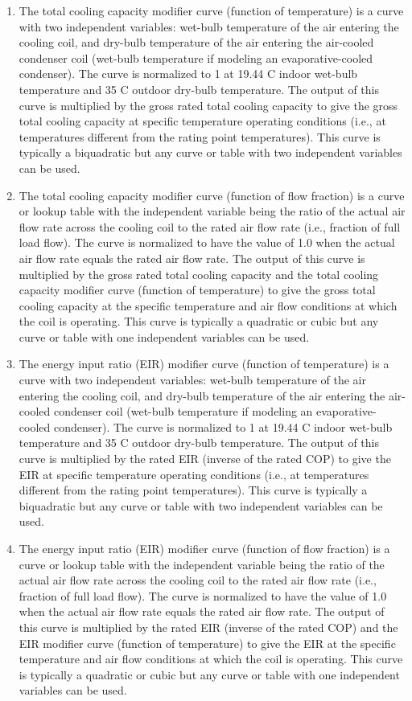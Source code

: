 \begin{enumerate}
\def\labelenumi{\arabic{enumi}.}
\item
  The total cooling capacity modifier curve (function of temperature) is a curve with two independent variables: wet-bulb temperature of the air entering the cooling coil, and dry-bulb temperature of the air entering the air-cooled condenser coil (wet-bulb temperature if modeling an evaporative-cooled condenser). The curve is normalized to 1 at 19.44 C indoor wet-bulb temperature and 35 C outdoor dry-bulb temperature. The output of this curve is multiplied by the gross rated total cooling capacity to give the gross total cooling capacity at specific temperature operating conditions (i.e., at temperatures different from the rating point temperatures). This curve is typically a biquadratic but any curve or table with two independent variables can be used.
\item
  The total cooling capacity modifier curve (function of flow fraction) is a curve or lookup table with the independent variable being the ratio of the actual air flow rate across the cooling coil to the rated air flow rate (i.e., fraction of full load flow). The curve is normalized to have the value of 1.0 when the actual air flow rate equals the rated air flow rate. The output of this curve is multiplied by the gross rated total cooling capacity and the total cooling capacity modifier curve (function of temperature) to give the gross total cooling capacity at the specific temperature and air flow conditions at which the coil is operating. This curve is typically a quadratic or cubic but any curve or table with one independent variables can be used.
\item
  The energy input ratio (EIR) modifier curve (function of temperature) is a curve with two independent variables: wet-bulb temperature of the air entering the cooling coil, and dry-bulb temperature of the air entering the air-cooled condenser coil (wet-bulb temperature if modeling an evaporative-cooled condenser). The curve is normalized to 1 at 19.44 C indoor wet-bulb temperature and 35 C outdoor dry-bulb temperature. The output of this curve is multiplied by the rated EIR (inverse of the rated COP) to give the EIR at specific temperature operating conditions (i.e., at temperatures different from the rating point temperatures). This curve is typically a biquadratic but any curve or table with two independent variables can be used.
\item
  The energy input ratio (EIR) modifier curve (function of flow fraction) is a curve or lookup table with the independent variable being the ratio of the actual air flow rate across the cooling coil to the rated air flow rate (i.e., fraction of full load flow). The curve is normalized to have the value of 1.0 when the actual air flow rate equals the rated air flow rate. The output of this curve is multiplied by the rated EIR (inverse of the rated COP) and the EIR modifier curve (function of temperature) to give the EIR at the specific temperature and air flow conditions at which the coil is operating. This curve is typically a quadratic or cubic but any curve or table with one independent variables can be used.

\end{enumerate}
